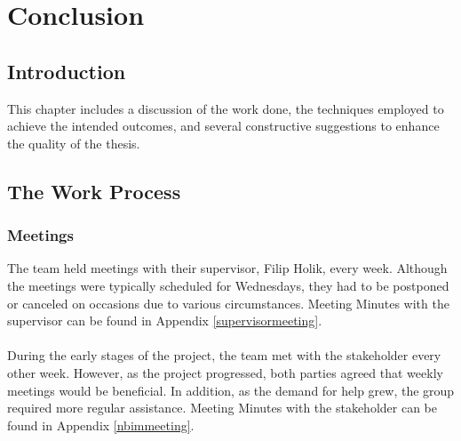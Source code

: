 \newpage
\thispagestyle{empty}
\mbox{}

\chapter{Conclusion}
\section{Introduction}
This chapter includes a discussion of the work done, the techniques employed to achieve the intended outcomes, and several constructive suggestions to enhance the quality of the thesis.

\section{The Work Process}

\subsection{Meetings}
The team held meetings with their supervisor, Filip Holik, every week. Although the meetings were typically scheduled for Wednesdays, they had to be postponed or canceled on occasions due to various circumstances. Meeting Minutes with the supervisor can be found in Appendix \ref{supervisormeeting}.
\\~\\
During the early stages of the project, the team met with the stakeholder every other week. However, as the project progressed, both parties agreed that weekly meetings would be beneficial. In addition, as the demand for help grew, the group required more regular assistance. Meeting Minutes with the stakeholder can be found in Appendix \ref{nbimmeeting}.  


